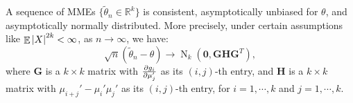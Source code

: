 \documentclass{huhtakm-template-book-v2}
\DeclareMathOperator{\E}{\mathbb{E}}
\DeclareMathOperator{\N}{N}
\begin{document}
    \begin{thm}
        \label{Chapter 2 (Theorem) Sequence of MME is asympt. normal}
        A sequence of MMEs $\{\widetilde{\theta}_{n} \in \mathbb{R}^{k}\}$ is consistent, asymptotically unbiased for $\theta$, and asymptotically normally distributed. More precisely, under certain assumptions like $\E\abs{X}^{2k} < \infty$, as $n \to \infty$, we have:
        \begin{equation*}
            \sqrt{n}(\widetilde{\theta}_{n} - \theta) \to \N_{k}(\mathbf{0}, \mathbf{GHG}^{T}),
        \end{equation*}
        where $\mathbf{G}$ is a $k \times k$ matrix with $\pdv{g_{i}}{\mu_{j}'}$ as its $(i, j)$-th entry, and $\mathbf{H}$ is a $k \times k$ matrix with $\mu_{i+j}' - \mu_{i}'\mu_{j}'$ as its $(i, j)$-th entry, for $i = 1, \cdots, k$ and $j = 1, \cdots, k$.
    \end{thm}
    \newpage
    
\end{document}
